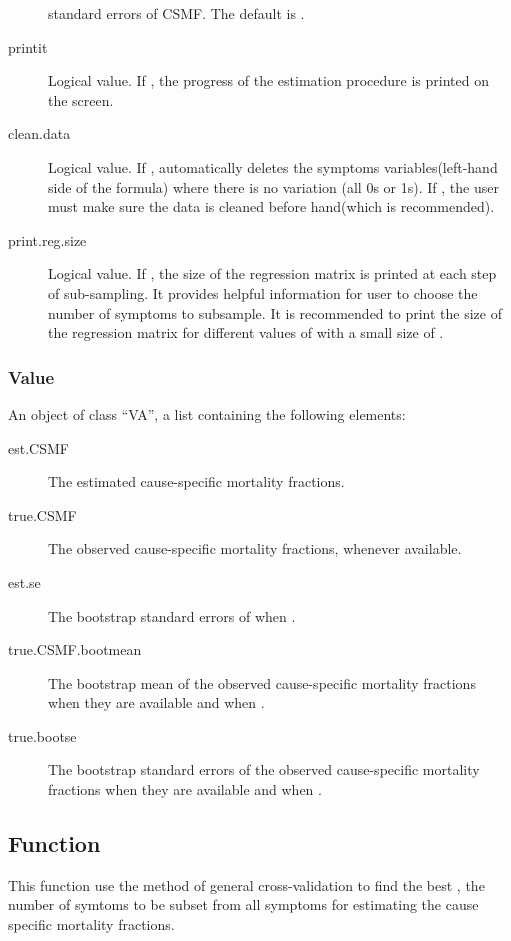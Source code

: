 \documentclass[oneside,letterpaper,titlepage]{article}
\begin{document}
\begin{description}
  standard errors of CSMF. The default is .
\item[printit] Logical value. If , the progress of the
  estimation procedure is printed on the screen.
 \item[clean.data] Logical value. If , 
    automatically deletes the symptoms variables(left-hand side of the
    formula) where there is no variation (all 0s or 1s). If
    , the user must make sure the data is cleaned before
    hand(which is recommended). 
  \item[print.reg.size] Logical value. If , the size of the
  regression matrix is printed at each step of sub-sampling. It provides
  helpful information for user to choose the number of symptoms to
  subsample. It is recommended to print the size of the regression
  matrix for different values of  with a small size of
  . 
\end{description}

\subsubsection{Value}

An object of class ``VA'', a list containing the following elements:
\begin{description}
\item[est.CSMF] The estimated cause-specific mortality fractions.
\item[true.CSMF] The observed cause-specific mortality fractions,
  whenever available.
\item[est.se] The bootstrap standard errors of  when
  .
\item[true.CSMF.bootmean] The bootstrap mean of the observed
  cause-specific mortality fractions when they are available and when
  .
\item[true.bootse] The bootstrap standard errors of the observed
  cause-specific mortality fractions when they are available and when
  .
 \end{description}


\subsection{Function }
This function use the method of general cross-validation to find the best 
, the number of symtoms to be subset from all symptoms for 
estimating the cause specific mortality fractions. 
\end{document}
